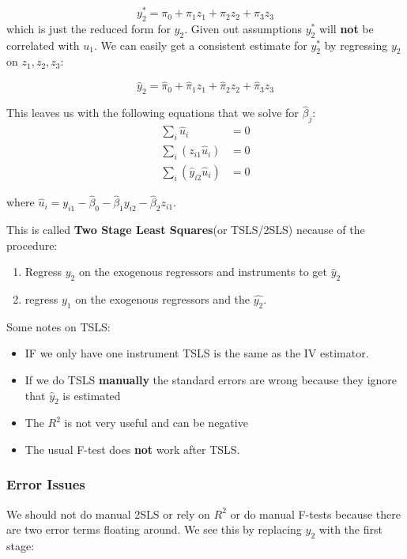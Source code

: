 \documentclass[11pt]{article}
\begin{document}
\begin{equation}
y_2^*=\pi_0+\pi_1 z_1+\pi_2 z_2+\pi_3 z_3
\end{equation}
which is just the reduced form for $y_2$. Given out assumptions $y_2^*$ will \textbf{not} be correlated with $u_1$. We can easily get a consistent estimate for $y_2^*$ by regressing $y_2$ on $z_1, z_2, z_3$:

\begin{equation}
\hat{y}_2=\hat{\pi}_0+\hat{\pi}_1 z_1+\hat{\pi}_2 z_2+\hat{\pi}_3 z_3
\end{equation}

This leaves us with the following equations that we solve for $\hat{\beta}_j$:
\begin{equation}
\begin{aligned}
\sum_i \hat{u}_i & =0 \\
\sum_i\left(z_{i 1} \hat{u}_i\right) & =0 \\
\sum_i\left(\hat{y}_{i 2} \hat{u}_i\right) & =0
\end{aligned}
\end{equation}

where $\hat{u}_i=y_{i 1}-\hat{\beta}_0-\hat{\beta}_1 y_{i 2}-\hat{\beta}_2 z_{i 1} .$

This is called \textbf{Two Stage Least Squares}(or TSLS/2SLS) necause of the procedure:
\begin{enumerate}
    \item Regress $y_2$ on the exogenous regressors and instruments to get $\hat{y}_2$
    \item regress $y_1$ on the exogenous regressors and the $\hat{y_2}$.
\end{enumerate}

\begin{note}
Some notes on TSLS:
\begin{itemize}
    \item IF we only have one instrument TSLS is the same as the IV estimator.
    \item If we do TSLS \textbf{manually} the standard errors are wrong because they ignore that $\hat{y}_2$ is estimated
    \item The $R^2$ is not very useful and can be negative
    \item The usual F-test does \textbf{not} work after TSLS.
\end{itemize}
\end{note}

\subsubsection{Error Issues}
We should not do manual 2SLS or rely on $R^2$ or do manual F-tests because there are two error terms floating around. We see this by replacing $y_2$ with the first stage:
\end{document}
